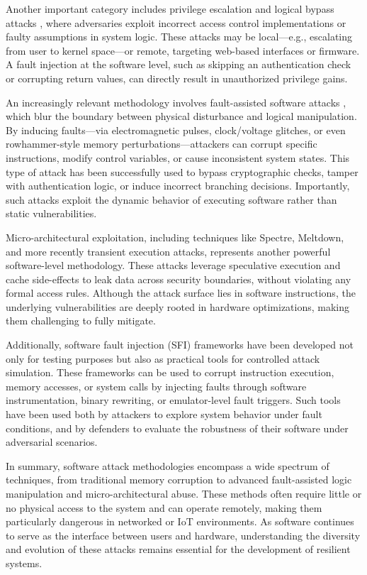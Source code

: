 Another important category includes privilege escalation \cite{davi2010privilege} and logical bypass attacks \cite{xu2017novel}, where adversaries exploit incorrect access control implementations or faulty assumptions in system logic. These attacks may be local—e.g., escalating from user to kernel space—or remote, targeting web-based interfaces or firmware. A fault injection at the software level, such as skipping an authentication check or corrupting return values, can directly result in unauthorized privilege gains.

An increasingly relevant methodology involves fault-assisted software attacks \cite{yuce2018fault}, which blur the boundary between physical disturbance and logical manipulation. By inducing faults—via electromagnetic pulses, clock/voltage glitches, or even rowhammer-style memory perturbations—attackers can corrupt specific instructions, modify control variables, or cause inconsistent system states. This type of attack has been successfully used to bypass cryptographic checks, tamper with authentication logic, or induce incorrect branching decisions. Importantly, such attacks exploit the dynamic behavior of executing software rather than static vulnerabilities.

Micro-architectural exploitation, including techniques like Spectre, Meltdown, and more recently transient execution attacks, represents another powerful software-level methodology. These attacks leverage speculative execution and cache side-effects to leak data across security boundaries, without violating any formal access rules. Although the attack surface lies in software instructions, the underlying vulnerabilities are deeply rooted in hardware optimizations, making them challenging to fully mitigate.

Additionally, software fault injection (SFI) frameworks \cite{9251063} have been developed not only for testing purposes but also as practical tools for controlled attack simulation. These frameworks can be used to corrupt instruction execution, memory accesses, or system calls by injecting faults through software instrumentation, binary rewriting, or emulator-level fault triggers. Such tools have been used both by attackers to explore system behavior under fault conditions, and by defenders to evaluate the robustness of their software under adversarial scenarios.

In summary, software attack methodologies encompass a wide spectrum of techniques, from traditional memory corruption to advanced fault-assisted logic manipulation and micro-architectural abuse. These methods often require little or no physical access to the system and can operate remotely, making them particularly dangerous in networked or IoT environments. As software continues to serve as the interface between users and hardware, understanding the diversity and evolution of these attacks remains essential for the development of resilient systems.

